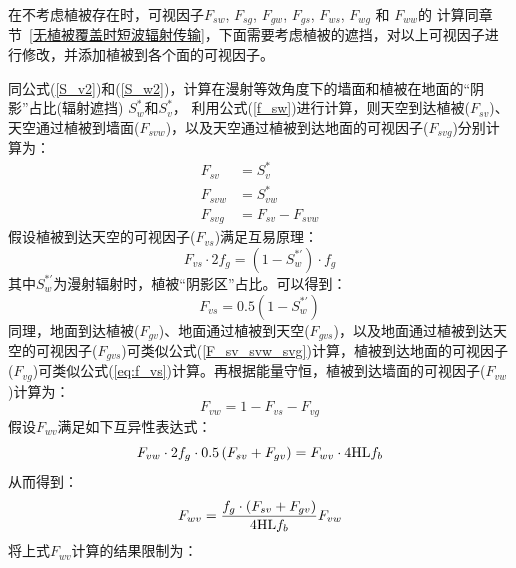 在不考虑植被存在时，可视因子$F_{sw}$, $F_{sg}$, $F_{gw}$, $F_{gs}$, $F_{ws}$, $F_{wg}$ 和 $F_{ww}$的
计算同章节~\ref{无植被覆盖时短波辐射传输}，下面需要考虑植被的遮挡，对以上可视因子进行修改，并添加植被到各个面的可视因子。

同公式(\ref{S_v2})和(\ref{S_w2})，计算在漫射等效角度下的墙面和植被在地面的“阴影”占比(辐射遮挡) $S_w^\ast$和$S_v^\ast$，
利用公式(\ref{f_sw})进行计算，则天空到达植被($F_{sv}$)、天空通过植被到墙面($F_{svw}$)，以及天空通过植被到达地面的可视因子($F_{svg}$)分别计算为：
\begin{equation}\label{F_sv_svw_svg}
\begin{aligned}F_{s v} &=S_{v}^{*} \\ F_{s v w} &=S_{v w}^{*} \\ F_{s v g} &=F_{s v}-F_{s v w}\end{aligned}
\end{equation}
假设植被到达天空的可视因子($F_{vs}$)满足互易原理：
\begin{equation}
F_{vs}\cdot 2f_g = \left( 1-S_w ^{*\prime} \right ) \cdot f_g
\end{equation}
其中$S_w ^{*\prime}$为漫射辐射时，植被“阴影区”占比。可以得到：
\begin{equation}\label{eq:f_vs}
F_{vs} = 0.5 \left( 1-S_w ^{*\prime} \right )
\end{equation}
同理，地面到达植被($F_{gv}$)、地面通过植被到天空($F_{gvs}$)，以及地面通过植被到达天空的可视因子($F_{gvs}$)可类似公式(\ref{F_sv_svw_svg})计算，植被到达地面的可视因子($F_{vg}$)可类似公式(\ref{eq:f_vs})计算。再根据能量守恒，植被到达墙面的可视因子($F_{vw}$)计算为：
\begin{equation}
F_{v w}=1-F_{v s}-F_{v g}
\end{equation}
假设$F_{wv}$满足如下互异性表达式：
\begin{equation}
F_{vw}\cdot 2f_g \cdot 0.5\left( F_{sv}+F_{gv} \right ) = F_{wv} \cdot 4 {\rm HL} f_b 
\end{equation}
从而得到：
\begin{equation}
F_{wv}=\frac{f_g \cdot \left( F_{sv}+F_{gv} \right )} {4 {\rm HL}f_b} F_{vw}
\end{equation}
将上式$F_{wv}$计算的结果限制为：

